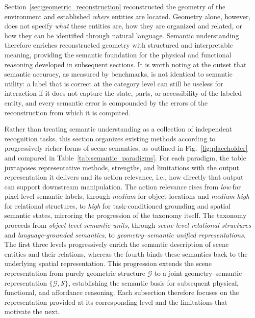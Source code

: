 \documentclass{SCIS2026}
\renewcommand{\arraystretch}{1.45}
\begin{document}
\begin{table}[!tbp]
\begin{tabularx}{\textwidth}
\end{tabularx}

\renewcommand{\arraystretch}{1.15}

\end{table}

Section~\ref{sec:geometric_reconstruction} reconstructed the geometry of the environment and established \emph{where} entities are located. Geometry alone, however, does not specify \emph{what} these entities are, how they are organized and related, or how they can be identified through natural language. Semantic understanding therefore enriches reconstructed geometry with structured and interpretable meaning, providing the semantic foundation for the physical and functional reasoning developed in subsequent sections. It is worth noting at the outset that semantic accuracy, as measured by benchmarks, is not identical to semantic utility: a label that is correct at the category level can still be useless for interaction if it does not capture the state, parts, or accessibility of the labeled entity, and every semantic error is compounded by the errors of the reconstruction from which it is computed.

Rather than treating semantic understanding as a collection of independent recognition tasks, this section organizes existing methods according to progressively richer forms of scene semantics, as outlined in Fig.~\ref{fig:placeholder} and compared in Table~\ref{tab:semantic_paradigms}. For each paradigm, the table juxtaposes representative methods, strengths, and limitations with the output representation it delivers and its action relevance, i.e., how directly that output can support downstream manipulation. The action relevance rises from \emph{low} for pixel-level semantic labels, through \emph{medium} for object locations and \emph{medium-high} for relational structures, to \emph{high} for task-conditioned grounding and spatial semantic states, mirroring the progression of the taxonomy itself. The taxonomy proceeds from \emph{object-level semantic units}, through \emph{scene-level relational structures} and \emph{language-grounded semantics}, to \emph{geometry--semantic unified representations}. The first three levels progressively enrich the semantic description of scene entities and their relations, whereas the fourth binds these semantics back to the underlying spatial representation. This progression extends the scene representation from purely geometric structure $\mathcal{G}$ to a joint geometry--semantic representation $\{\mathcal{G},\mathcal{S}\}$, establishing the semantic basis for subsequent physical, functional, and affordance reasoning. Each subsection therefore focuses on the representation provided at its corresponding level and the limitations that motivate the next.
\end{document}
